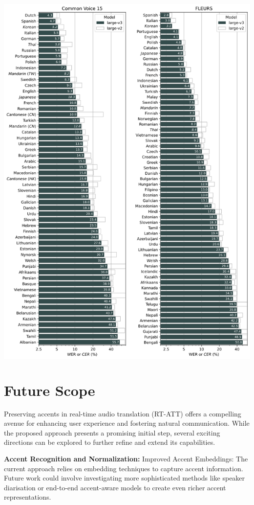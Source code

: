 \documentclass[12px, a4paper]{article}
\begin{document}
\pagebreak
\includegraphics[width=\textwidth]{wer-cer.png}

\section{Future Scope}
Preserving accents in real-time audio translation (RT-ATT) offers a compelling avenue for enhancing user experience and fostering natural communication. While the proposed approach presents a promising initial step, several exciting directions can be explored to further refine and extend its capabilities.

\textbf{Accent Recognition and Normalization:}
Improved Accent Embeddings: The current approach relies on embedding techniques to capture accent information. Future work could involve investigating more sophisticated methods like speaker diarisation or end-to-end accent-aware models to create even richer accent representations.
\end{document}
